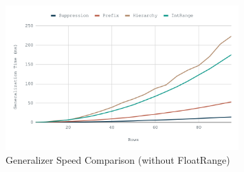 \begin{figure}[H]
    \centering
    \includegraphics[width=0.8\textwidth]{images/compare-fast.png}
    \caption{Generalizer Speed Comparison (without FloatRange)}\label{fig:compare_fast}
\end{figure}